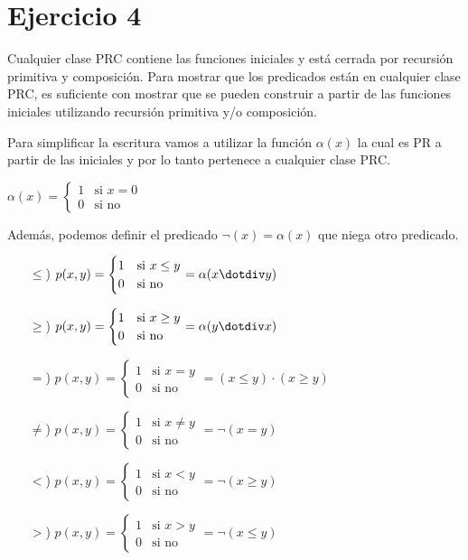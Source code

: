 \section*{Ejercicio 4}

Cualquier clase PRC contiene las funciones iniciales y está cerrada por recursión primitiva y composición. Para mostrar que los predicados están en cualquier clase PRC, es suficiente con mostrar que se pueden construir a partir de las funciones iniciales utilizando recursión primitiva y/o composición.

Para simplificar la escritura vamos a utilizar la función $\alpha(x)$ la cual es PR a partir de las iniciales y por lo tanto pertenece a cualquier clase PRC.

$\alpha(x) = \begin{cases}
    1 & \text{si } x = 0 \\
    0 & \text{si no}
\end{cases}$

Además, podemos definir el predicado $\neg(x) = \alpha(x)$ que niega otro predicado.

\begin{itemize}
    \item[$\leq$)] $p(x, y) = \begin{cases}
        1 & \text{si } x \leq y \\
        0 & \text{si no}
    \end{cases} = \alpha(x \dotdiv y)$

    \item[$\geq$)] $p(x, y) = \begin{cases}
        1 & \text{si } x \geq y \\
        0 & \text{si no}
    \end{cases} = \alpha(y \dotdiv x)$

    \item[$=$)] $p(x, y) = \begin{cases}
        1 & \text{si } x = y \\
        0 & \text{si no}
    \end{cases} = (x \leq y) \cdot (x \geq y)$

    \item[$\neq$)] $p(x, y) = \begin{cases}
        1 & \text{si } x \neq y \\
        0 & \text{si no}
    \end{cases} = \neg(x = y)$

    \item[$<$)] $p(x, y) = \begin{cases}
        1 & \text{si } x < y \\
        0 & \text{si no}
    \end{cases} = \neg(x \geq y)$

    \item[$>$)] $p(x, y) = \begin{cases}
        1 & \text{si } x > y \\
        0 & \text{si no}
    \end{cases} = \neg(x \leq y)$
\end{itemize}
